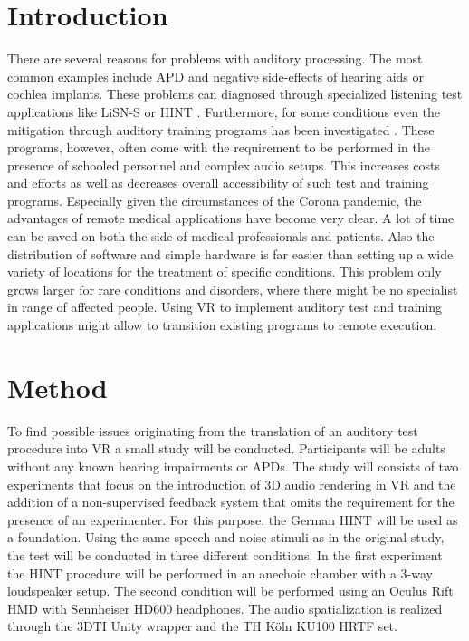 \documentclass[a4paper,11pt]{article}%
\renewcommand{\\}{\vspace*{0.5\baselineskip} \newline}
\begin{document}
\section{Introduction}
There are several reasons for problems with auditory processing. The most common examples include \ac{APD} and negative side-effects of hearing aids or cochlea implants. These problems can diagnosed through specialized listening test applications like \ac{LiSN-S} \cite{Cameron2007} or \ac{HINT} \cite{Nilsson1994}. Furthermore, for some conditions even the mitigation through auditory training programs has been investigated \cite{Tyler2010}\cite{Cameron2011}. These programs, however, often come with the requirement to be performed in the presence of schooled personnel and complex audio setups. This increases costs and efforts as well as decreases overall accessibility of such test and training programs. Especially given the circumstances of the Corona pandemic, the advantages of remote medical applications have become very clear. A lot of time can be saved on both the side of medical professionals and patients. Also the distribution of software and simple hardware is far easier than setting up a wide variety of locations for the treatment of specific conditions. This problem only grows larger for rare conditions and disorders, where there might be no specialist in range of affected people. Using \ac{VR} to implement auditory test and training applications might allow to transition existing programs to remote execution.


\section{Method}
To find possible issues originating from the translation of an auditory test procedure into \ac{VR} a small study will be conducted. Participants will be adults without any known hearing impairments or \ac{APD}s. The study will consists of two experiments that focus on the introduction of 3D audio rendering in \ac{VR} and the addition of a non-supervised feedback system that omits the requirement for the presence of an experimenter.
\newline
\newline
For this purpose, the German \ac{HINT} will be used as a foundation. Using the same speech and noise stimuli as in the original study, the test will be conducted in three different conditions. In the first experiment the \ac{HINT} procedure will be performed in an anechoic chamber with a 3-way loudspeaker setup. The second condition will be performed using an Oculus Rift \ac{HMD} with Sennheiser HD600 headphones. The audio spatialization is realized through the \ac{3DTI} Unity wrapper and the TH Köln KU100 \ac{HRTF} set.
\end{document}
